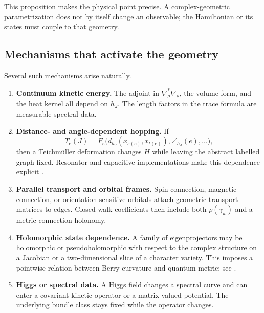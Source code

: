 \documentclass[11pt]{article}
\theoremstyle{definition}
\theoremstyle{remark}
\begin{document}
This proposition makes the physical point precise.  A complex-geometric
parametrization does not by itself change an observable; the Hamiltonian or
its states must couple to that geometry.

\subsection{Mechanisms that activate the geometry}

Several such mechanisms arise naturally.

\begin{enumerate}[label=\textup{(\roman*)},leftmargin=2.6em]
\item \textbf{Continuum kinetic energy.}
  The adjoint in \(\nabla_\rho^*\nabla_\rho\), the volume form, and the heat
  kernel all depend on \(h_J\).  The length factors in the trace formula are
  measurable spectral data.

\item \textbf{Distance- and angle-dependent hopping.}
  If
  \[
        T_e(J)=F_e\bigl(d_{h_J}(x_{s(e)},x_{t(e)}),
                 \angle_{h_J}(e),\ldots\bigr),
        \tag{5.13}\label{eq:metric-hopping}
  \]
  then a Teichm\"uller deformation changes \(H\) while leaving the abstract
  labelled graph fixed.  Resonator and capacitive implementations make this
  dependence explicit \cite{XuEtAl2025}.

\item \textbf{Parallel transport and orbital frames.}
  Spin connection, magnetic connection, or orientation-sensitive orbitals
  attach geometric transport matrices to edges.  Closed-walk coefficients
  then include both \(\rho(\gamma_w)\) and a metric connection holonomy.

\item \textbf{Holomorphic state dependence.}
  A family of eigenprojectors may be holomorphic or pseudoholomorphic with
  respect to the complex structure on a Jacobian or a two-dimensional slice
  of a character variety.  This imposes a pointwise relation between Berry
  curvature and quantum metric; see
  .

\item \textbf{Higgs or spectral data.}
  A Higgs field changes a spectral curve and can enter a covariant kinetic
  operator or a matrix-valued potential.  The underlying bundle class stays
  fixed while the operator changes.
\end{enumerate}
\end{document}
